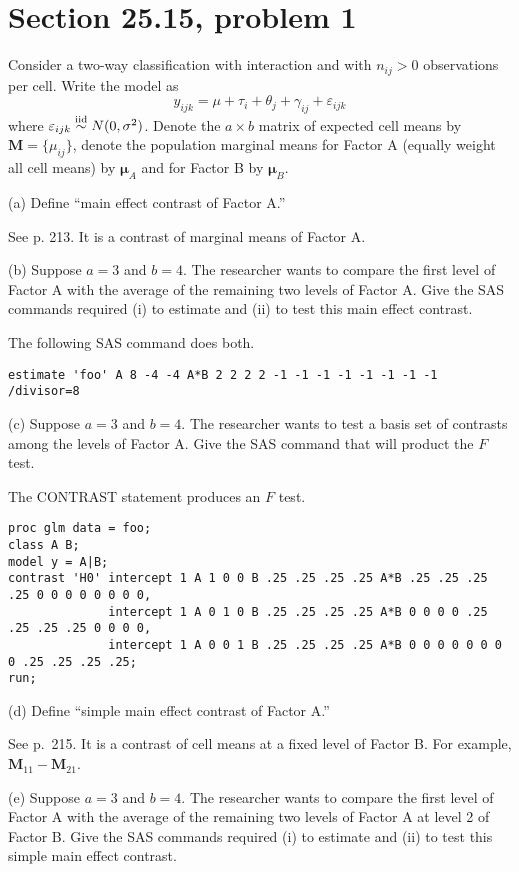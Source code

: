 
\section{Section 25.15, problem 1}
Consider a two-way classification with interaction and with
$n_{ij}>0$ observations per cell. Write the model as
\[
y_{ijk}=\mu+\tau_i+\theta_j+\gamma_{ij}+\varepsilon_{ijk}
\]
where $\varepsilon_{ijk}\stackrel{\rm iid}{\sim}
N(0,\sigma^2)$. Denote the $a\times b$ matrix of expected cell means
by $\mathbf M=\{\mu_{ij}\}$, denote the population marginal means
for Factor A (equally weight all cell means) by $\bm\mu_A$ and for
Factor B by $\bm\mu_B$.

\bigskip
\noindent
(a) Define ``main effect contrast of Factor A.''

\bigskip
\noindent
See p. 213. It is a contrast of marginal means of Factor A.

\bigskip
\noindent
(b) Suppose $a=3$ and $b=4$. The researcher wants to compare the
first level of Factor A with the average of the remaining two levels
of Factor A. Give the SAS commands required (i) to estimate and
(ii) to test this main effect contrast.

\bigskip
\noindent
The following SAS command does both.
\begin{verbatim}
estimate 'foo' A 8 -4 -4 A*B 2 2 2 2 -1 -1 -1 -1 -1 -1 -1 -1 /divisor=8
\end{verbatim}

\bigskip
\noindent
(c) Suppose $a=3$ and $b=4$. The researcher wants to test a basis
set of contrasts among the levels of Factor A.
Give the SAS command that will product the $F$ test.

\bigskip
\noindent
The CONTRAST statement produces an $F$ test.
\begin{verbatim}
proc glm data = foo;
class A B;
model y = A|B;
contrast 'H0' intercept 1 A 1 0 0 B .25 .25 .25 .25 A*B .25 .25 .25 .25 0 0 0 0 0 0 0 0,
              intercept 1 A 0 1 0 B .25 .25 .25 .25 A*B 0 0 0 0 .25 .25 .25 .25 0 0 0 0,
              intercept 1 A 0 0 1 B .25 .25 .25 .25 A*B 0 0 0 0 0 0 0 0 .25 .25 .25 .25;
run;
\end{verbatim}

\bigskip
\noindent
(d) Define ``simple main effect contrast of Factor A.''

\bigskip
\noindent
See p.\ 215. It is a contrast of cell means at a
fixed level of Factor B. For example, $\mathbf M_{11}-\mathbf M_{21}$.

\bigskip
\noindent
(e) Suppose $a=3$ and $b=4$. The researcher wants to compare the first
level of Factor A with the average of the remaining two levels of
Factor A at level 2 of Factor B. Give the SAS commands required
(i) to estimate and (ii) to test this simple main effect contrast.

